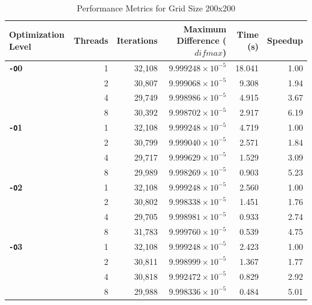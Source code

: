 \documentclass{article}
\begin{document}
\begin{table}[H]
    \centering
    \caption{Performance Metrics for Grid Size 200x200}
    \label{tab:performance_200}
    \begin{tabular}{l r r r r r}
    \toprule
    \textbf{Optimization Level} & \textbf{Threads} & \textbf{Iterations} & \textbf{Maximum Difference ($difmax$)} & \textbf{Time (s)} & \textbf{Speedup} \\
    \midrule
    \textbf{\texttt{-O}0} & 1 & 32,108 & $9.999248 \times 10^{-5}$ & 18.041 & 1.00 \\
        & 2 & 30,807 & $9.999068 \times 10^{-5}$ & 9.308 & 1.94 \\
        & 4 & 29,749 & $9.998986 \times 10^{-5}$ & 4.915 & 3.67 \\
        & 8 & 30,392 & $9.998702 \times 10^{-5}$ & 2.917 & 6.19 \\
    \midrule
    \textbf{\texttt{-O}1} & 1 & 32,108 & $9.999248 \times 10^{-5}$ & 4.719 & 1.00 \\
        & 2 & 30,799 & $9.999040 \times 10^{-5}$ & 2.571 & 1.84 \\
        & 4 & 29,717 & $9.999629 \times 10^{-5}$ & 1.529 & 3.09 \\
        & 8 & 29,989 & $9.998269 \times 10^{-5}$ & 0.903 & 5.23 \\
    \midrule
    \textbf{\texttt{-O}2} & 1 & 32,108 & $9.999248 \times 10^{-5}$ & 2.560 & 1.00 \\
        & 2 & 30,802 & $9.998338 \times 10^{-5}$ & 1.451 & 1.76 \\
        & 4 & 29,705 & $9.998981 \times 10^{-5}$ & 0.933 & 2.74 \\
        & 8 & 31,783 & $9.999760 \times 10^{-5}$ & 0.539 & 4.75 \\
    \midrule
    \textbf{\texttt{-O}3} & 1 & 32,108 & $9.999248 \times 10^{-5}$ & 2.423 & 1.00 \\
        & 2 & 30,811 & $9.998999 \times 10^{-5}$ & 1.367 & 1.77 \\
        & 4 & 30,818 & $9.992472 \times 10^{-5}$ & 0.829 & 2.92 \\
        & 8 & 29,988 & $9.998336 \times 10^{-5}$ & 0.484 & 5.01 \\
    \bottomrule
    \end{tabular}
\end{table}
\end{document}
